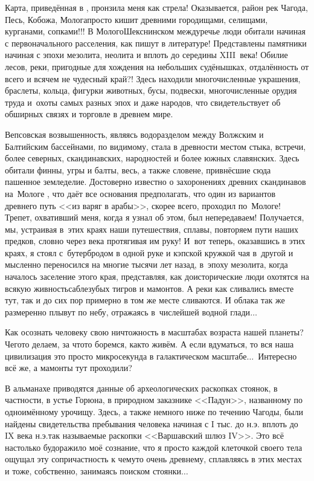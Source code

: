 Карта, приведённая в \cite{БашенькинМологоШекснинскоеМеждуречье}, пронзила меня как стрела! Оказывается, район рек Чагода, Песь, Кобожа, Молога\mdash просто кишит древними городищами, селищами, курганами, сопками!!! В Молого\sdash Шекснинском междуречье люди обитали начиная с первоначального расселения, как пишут в литературе! Представлены памятники начиная с эпохи мезолита, неолита и вплоть до середины XIII~века! Обилие лесов, реки, пригодные для хождения на небольших судёнышках, отдалённость от всего и вся\mdash чем не чудесный край?! Здесь находили многочисленные украшения, браслеты, кольца, фигурки животных, бусы, подвески, многочисленные орудия труда и~охоты самых разных эпох и даже народов, что свидетельствует об обширных связях и торговле в древнем мире.

Вепсовская возвышенность, являясь водоразделом между Волжским и Балтийским бассейнами, по видимому, стала в древности местом стыка, встречи, более северных, скандинавских, народностей и более южных славянских. Здесь обитали финны, угры и балты, весь, а также словене, привнёсшие сюда пашенное земледелие. Достоверно известно о захоронениях древних скандинавов на~Мологе \cite{БашенькинМологоШекснинскоеМеждуречье}, что даёт все основания предполагать, что один из вариантов древнего путь <<из варяг в арабы>>, скорее всего, проходил по~Мологе! Трепет, охвативший меня, когда я узнал об этом, был непередаваем! Получается, мы, устраивая в~этих краях наши путешествия, сплавы, повторяем пути наших предков, словно через века протягивая им руку!
\newpage
И~вот теперь, оказавшись в этих краях, я стоял с~бутербродом в одной руке и кэпской кружкой чая в~другой и мысленно переносился на многие тысячи лет назад, в~эпоху мезолита, когда началось заселение этого края, представляя, как доисторические люди охотятся на всякую живность\mdash саблезубых тигров и мамонтов. А реки как сливались вместе тут, так и до сих пор примерно в том же месте сливаются. И облака так же размеренно плывут по небу, отражаясь в~числейшей водной глади$\ldots$

Как осознать человеку свою ничтожность в масштабах возраста нашей планеты? Чего\sdash то делаем, за что\sdash то боремся, как\sdash то живём. А если вдуматься, то вся наша цивилизация \mdash это просто микросекунда в галактическом масштабе$\ldots$~Интересно всё же, а мамонты тут проходили?

В альманахе \cite{ЧагодаАльманахБашенькин} приводятся данные об археологических раскопках стоянок, в частности, в устье Горюна, в природном заказнике <<Падун>>, названному по одноимённому урочищу. Здесь, а также немного ниже по течению Чагоды, были найдены свидетельства пребывания человека начиная с I тыс. до н.э. вплоть до IX века н.э.\mdash так называемые раскопки <<Варшавский шлюз I\nbdash V>>. Это всё настолько будоражило моё сознание, что я просто каждой клеточкой своего тела ощущал эту сопричастность к чему\sdash то очень древнему, сплавляясь в этих местах и тоже, собственно, занимаясь поиском стоянки$\ldots$


